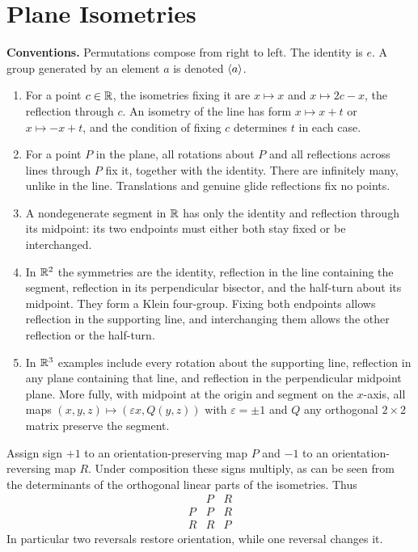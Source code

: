\section{Plane Isometries}
\textbf{Conventions.} Permutations compose from right to left. The identity is $e$. A group generated by an element $a$ is denoted $\langle a\rangle$.

\begin{enumerate}[label=(\alph*)]
\item For a point $c\in\mathbb{R}$, the isometries fixing it are $x\mapsto x$ and $x\mapsto2c-x$, the reflection through $c$. An isometry of the line has form $x\mapsto x+t$ or $x\mapsto-x+t$, and the condition of fixing $c$ determines $t$ in each case.
\item For a point $P$ in the plane, all rotations about $P$ and all reflections across lines through $P$ fix it, together with the identity. There are infinitely many, unlike in the line. Translations and genuine glide reflections fix no points.
\item A nondegenerate segment in $\mathbb{R}$ has only the identity and reflection through its midpoint: its two endpoints must either both stay fixed or be interchanged.
\item In $\mathbb{R}^2$ the symmetries are the identity, reflection in the line containing the segment, reflection in its perpendicular bisector, and the half-turn about its midpoint. They form a Klein four-group. Fixing both endpoints allows reflection in the supporting line, and interchanging them allows the other reflection or the half-turn.
\item In $\mathbb{R}^3$ examples include every rotation about the supporting line, reflection in any plane containing that line, and reflection in the perpendicular midpoint plane. More fully, with midpoint at the origin and segment on the $x$-axis, all maps $(x,y,z)\mapsto(\varepsilon x,Q(y,z))$ with $\varepsilon=\pm1$ and $Q$ any orthogonal $2\times2$ matrix preserve the segment.
\end{enumerate}

Assign sign $+1$ to an orientation-preserving map $P$ and $-1$ to an orientation-reversing map $R$. Under composition these signs multiply, as can be seen from the determinants of the orthogonal linear parts of the isometries. Thus
\[\begin{array}{c|cc}&P&R\\\hline P&P&R\\R&R&P\end{array}\]
In particular two reversals restore orientation, while one reversal changes it.

